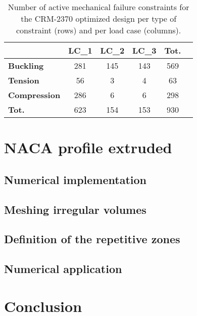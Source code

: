 \begin{table}
\centering
\begin{tabular}{lS[table-format=3.0]S[table-format=3.0]S[table-format=3.0]S[table-format=3.0]S[table-format=3.0]}
\toprule
                     & \textbf{LC\_1} & \textbf{LC\_2} & \textbf{LC\_3} & \textbf{Tot.} \\ \midrule
\textbf{Buckling}    & 281           & 145           & 143           & 569           \\
\textbf{Tension}     & 56            & 3             & 4             & 63            \\
\textbf{Compression} & 286           & 6             & 6             & 298           \\
\midrule
\textbf{Tot.}        & 623           & 154           & 153           & 930          \\
\bottomrule
\end{tabular}
\caption{Number of active mechanical failure constraints for the CRM-2370 optimized design per type of constraint (rows) and per load case (columns).}
\label{tab:constrNLP}
\end{table}

\section{NACA profile extruded}

\subsection{Numerical implementation}

\subsection{Meshing irregular volumes}

\subsection{Definition of the repetitive zones}

\subsection{Numerical application}

\section{Conclusion}